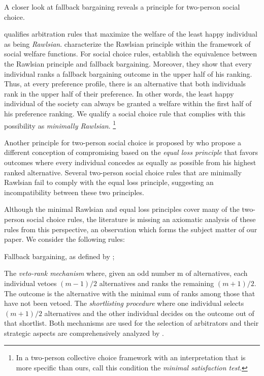 \documentclass[version=3.21, pagesize, twoside=off, bibliography=totoc, DIV=calc, fontsize=12pt, a4paper]{scrartcl}
\begin{document}
A closer look at fallback bargaining reveals a principle for two-person social choice.

\cite{Sprumont1993} qualifies arbitration rules that maximize the welfare of the least happy individual as being \textit{Rawlsian}. \cite{congar2012characterization} characterize the Rawlsian principle within the framework of social welfare functions. For social choice rules, \cite{BramsKilgour2001} establish the equivalence between the Rawlsian principle and fallback bargaining. Moreover, they show that every individual ranks a fallback bargaining outcome in the upper half of his ranking. Thus, at every preference profile, there is an alternative that both individuals rank in the upper half of their preference. In other words, the least happy individual of the society can always be granted a welfare within the first half of his preference ranking. We qualify a social choice rule that complies with this possibility as \textit{minimally Rawlsian}.
\footnote{In a two-person collective choice framework with an interpretation that is more specific than ours, \cite{Clippel} call this condition the \textit{minimal satisfaction test}.}

Another principle for two-person social choice is proposed by \cite{cailloux2022compromising} who propose a different conception of compromising based on the \textit{equal loss principle} that favors outcomes where every individual concedes as equally as possible from his highest ranked alternative. Several two-person social choice rules that are minimally Rawlsian fail to comply with the equal loss principle, suggesting an incompatibility between these two principles.
 
Although the minimal Rawlsian and equal loss principles cover many of the two-person social choice rules, the literature is missing an axiomatic analysis of these rules from this perspective, an observation which forms the subject matter of our paper. We consider the following rules:

Fallback bargaining, as defined by \cite{BramsKilgour2001};

The \textit{veto-rank mechanism} where, given an odd number m of alternatives, each individual vetoes $(m−1) / 2$ alternatives and ranks the remaining $(m+1) / 2$. The outcome is the alternative with the minimal sum of ranks among those that have not been vetoed. The \textit{shortlisting procedure} where one individual selects $(m+1) / 2$ alternatives and the other individual decides on the outcome out of that shortlist. Both mechanisms are used for the selection of arbitrators and their strategic aspects are comprehensively analyzed by \cite{Clippel}.
\end{document}

